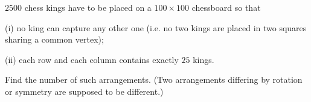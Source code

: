 $2500$ chess kings have to be placed on a $100 \times 100$ chessboard so that

(i) no king can capture any other one (i.e. no two kings are placed in two squares sharing a common vertex);

(ii) each row and each column contains exactly $25$ kings.

Find the number of such arrangements. (Two arrangements differing by rotation or symmetry are supposed to be different.)
